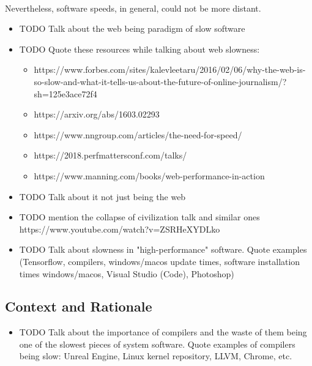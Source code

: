 \documentclass[12pt]{article}
\begin{document}
	\paragraph{}Nevertheless, software speeds, in general, could not be more distant.\linebreak
	
	\begin{itemize}
		\item TODO Talk about the web being paradigm of slow software
		\item TODO Quote these resources while talking about web slowness:
		\begin{itemize}
			\item https://www.forbes.com/sites/kalevleetaru/2016/02/06/why-the-web-is-so-slow-and-what-it-tells-us-about-the-future-of-online-journalism/?sh=125e3ace72f4 
			\item https://arxiv.org/abs/1603.02293
			
			\item https://www.nngroup.com/articles/the-need-for-speed/
			\item https://2018.perfmattersconf.com/talks/
			\item https://www.manning.com/books/web-performance-in-action
		\end{itemize}
		\item TODO Talk about it not just being the web
		\item TODO mention the collapse of civilization talk and similar ones \linebreak https://www.youtube.com/watch?v=ZSRHeXYDLko
		\item TODO Talk about slowness in "high-performance" software. Quote examples (Tensorflow, compilers, windows/macos update times, software installation times windows/macos, Visual Studio (Code), Photoshop)
	
	\end{itemize}
	
	
	\subsection{Context and Rationale}
		\begin{itemize}
		\item TODO Talk about the importance of compilers and the waste of them being one of the slowest pieces of system software. Quote examples of compilers being slow: Unreal Engine, Linux kernel repository, LLVM, Chrome, etc.
		
	
	\end{itemize}
\end{document}
